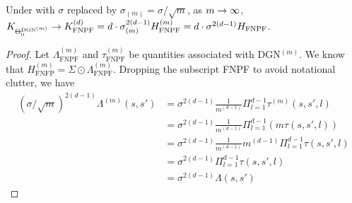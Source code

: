 \begin{appendix}
\begin{corollary} Under  with $\sigma$ replaced by $\sigma_{(m)}=\sigma/\sqrt{m}$, as $m\rightarrow\infty$, $K_{\Theta^{\text{DGN}^{(m)}}_0}\rightarrow K^{(d)}_{\text{FNPF}} = d\cdot \sigma_{(m)}^{2(d-1)} H^{(m)}_{\text{FNPF}}= d\cdot \sigma^{2(d-1)} H_{\text{FNPF}}$.
\end{corollary}
\begin{proof}
Let $\Lambda^{(m)}_{\text{FNPF}}$ and $\tau^{(m)}_{\text{FNPF}}$ be quantities associated with DGN${}^{(m)}$. We know that  $H^{(m)}_{\text{FNFP}}=\Sigma\odot\Lambda^{(m)}_{\text{FNPF}}$. Dropping the subscript FNPF to avoid notational clutter, we have
\begin{align*}
\left(\sigma/\sqrt{m}\right)^{2(d-1)}\Lambda^{(m)}(s,s')&=\sigma^{2(d-1)}\frac{1}{m^{(d-1)}}\Pi_{l=1}^{d-1}\tau^{(m)}(s,s',l)\\
&=\sigma^{2(d-1)}\frac{1}{m^{(d-1)}}\Pi_{l=1}^{d-1}\left(m \tau(s,s',l)\right)\\
&=\sigma^{2(d-1)}\frac{1}{m^{(d-1)}}m^{(d-1)}\Pi_{l=1}^{d-1} \tau(s,s',l)\\
&=\sigma^{2(d-1)}\Pi_{l=1}^{d-1} \tau(s,s',l)\\
&=\sigma^{2(d-1)}\Lambda(s,s')
\end{align*}
\end{proof}



\end{appendix}
